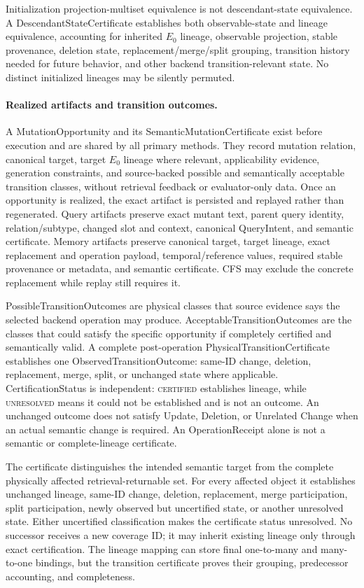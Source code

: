 Initialization projection-multiset equivalence is not descendant-state
equivalence. A DescendantStateCertificate establishes both observable-state
and lineage equivalence, accounting for inherited \(E_0\) lineage, observable
projection, stable provenance, deletion state, replacement/merge/split
grouping, transition history needed for future behavior, and other backend
transition-relevant state. No distinct initialized lineages may be silently
permuted.

\paragraph{Realized artifacts and transition outcomes.}
A MutationOpportunity and its SemanticMutationCertificate exist before
execution and are shared by all primary methods. They record mutation relation,
canonical target, target \(E_0\) lineage where relevant, applicability
evidence, generation constraints, and source-backed possible and semantically
acceptable transition classes, without
retrieval feedback or evaluator-only data. Once an opportunity is realized,
the exact artifact is persisted and replayed rather than regenerated. Query
artifacts preserve exact mutant text, parent query identity, relation/subtype,
changed slot and context, canonical QueryIntent, and semantic certificate.
Memory artifacts preserve canonical target, target lineage, exact replacement
and operation payload, temporal/reference values, required stable provenance
or metadata, and semantic certificate. CFS may exclude the concrete
replacement while replay still requires it.

PossibleTransitionOutcomes are physical classes that source evidence says the
selected backend operation may produce. AcceptableTransitionOutcomes are the
classes that could satisfy the specific opportunity if completely certified
and semantically valid. A complete post-operation
PhysicalTransitionCertificate establishes one ObservedTransitionOutcome:
same-ID change, deletion, replacement, merge, split, or unchanged state where
applicable. CertificationStatus is independent: \textsc{certified} establishes
lineage, while \textsc{unresolved} means it could not be established and is
not an outcome. An unchanged outcome does not satisfy Update, Deletion, or
Unrelated Change when an actual semantic change is required. An OperationReceipt
alone is not a semantic or complete-lineage certificate.

The certificate distinguishes the intended semantic target from the complete
physically affected retrieval-returnable set. For every affected object it
establishes unchanged lineage, same-ID change, deletion, replacement, merge
participation, split participation, newly observed but uncertified state, or
another unresolved state. Either uncertified classification makes the
certificate status unresolved. No successor receives a new coverage ID; it may
inherit existing lineage only through exact certification. The lineage mapping
can store final one-to-many and many-to-one bindings, but the transition
certificate proves their grouping, predecessor accounting, and completeness.

